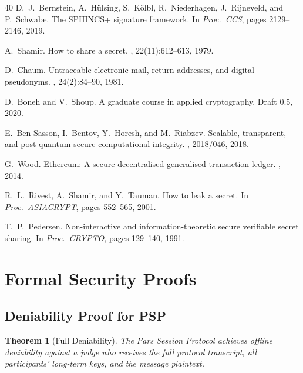 \documentclass[11pt,a4paper]{article}
\newtheorem{theorem}{Theorem}
\begin{document}
\begin{thebibliography}{40}
D.~J.~Bernstein, A.~H\"{u}lsing, S.~K\"{o}lbl, R.~Niederhagen, J.~Rijneveld, and P.~Schwabe.
\newblock The {SPHINCS+} signature framework.
\newblock In {\em Proc.\ CCS}, pages 2129--2146, 2019.

A.~Shamir.
\newblock How to share a secret.
, 22(11):612--613, 1979.

D.~Chaum.
\newblock Untraceable electronic mail, return addresses, and digital pseudonyms.
, 24(2):84--90, 1981.

D.~Boneh and V.~Shoup.
\newblock A graduate course in applied cryptography.
\newblock Draft 0.5, 2020.

E.~Ben-Sasson, I.~Bentov, Y.~Horesh, and M.~Riabzev.
\newblock Scalable, transparent, and post-quantum secure computational integrity.
, 2018/046, 2018.

G.~Wood.
\newblock Ethereum: A secure decentralised generalised transaction ledger.
, 2014.

R.~L.~Rivest, A.~Shamir, and Y.~Tauman.
\newblock How to leak a secret.
\newblock In {\em Proc.\ ASIACRYPT}, pages 552--565, 2001.

T.~P.~Pedersen.
\newblock Non-interactive and information-theoretic secure verifiable secret sharing.
\newblock In {\em Proc.\ CRYPTO}, pages 129--140, 1991.

\end{thebibliography}


\appendix

\section{Formal Security Proofs}
\label{app:proofs}

\subsection{Deniability Proof for PSP}

\begin{theorem}[Full Deniability]
The Pars Session Protocol achieves offline deniability against a judge who receives the full protocol transcript, all participants' long-term keys, and the message plaintext.
\end{theorem}
\end{document}
